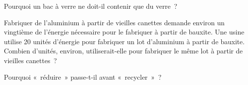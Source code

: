 \begin{exercise}[$\star$]\label{exo:g5:raw-materials-and-recycling:9}
Pourquoi un bac à verre ne doit-il contenir que du verre~?
\end{exercise}

\begin{exercise}[$\star\star$]\label{exo:g5:raw-materials-and-recycling:10}
Fabriquer de l'aluminium à partir de vieilles canettes demande environ
un vingtième de l'énergie nécessaire pour le fabriquer à partir de
bauxite. Une usine utilise 20 unités d'énergie pour fabriquer un lot
d'aluminium à partir de bauxite. Combien d'unités, environ,
utiliserait-elle pour fabriquer le même lot à partir de vieilles
canettes~?
\end{exercise}

\begin{exercise}[$\star\star$]\label{exo:g5:raw-materials-and-recycling:11}
Pourquoi «~réduire~» passe-t-il avant «~recycler~»~?
\end{exercise}

